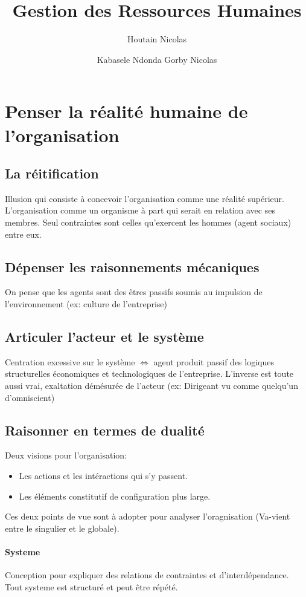 \documentclass[11pt]{article} %
\title{Gestion des Ressources Humaines}
\author{Houtain Nicolas \and Kabasele Ndonda Gorby Nicolas}
\begin{document}
\maketitle

\section{Penser la réalité humaine de l'organisation}
	\subsection{La réitification}
		Illusion qui consiste à concevoir l'organisation comme une réalité supérieur.
		L'organisation comme un organisme à part qui serait en relation avec ses membres.
		Seul contraintes sont celles qu'exercent les hommes (agent sociaux) entre eux.
	\subsection{Dépenser les raisonnements mécaniques}
		On pense que les agents sont des êtres passifs soumis au impulsion de l'environnement (ex: culture de
		l'entreprise)
	\subsection{Articuler l'acteur et le système}
		Centration excessive sur le système $\Leftrightarrow$ agent produit passif des logiques structurelles 
		économiques et technologiques de l'entreprise. L'inverse est toute aussi vrai, exaltation démésurée de 
		l'acteur (ex: Dirigeant vu comme quelqu'un d'omniscient)
	\subsection{Raisonner en termes de dualité}
		Deux visions pour l'organisation:
		\begin{itemize}
			\item Les actions et les intéractions qui s'y passent.
			\item Les éléments constitutif de configuration plus large.
		\end{itemize}
		Ces deux points de vue sont à adopter pour analyser l'oragnisation (Va-vient entre le singulier et le 		
		globale).
		\paragraph{Systeme} Conception pour expliquer des relations de contraintes et d'interdépendance. 
		Tout systeme est structuré et peut être répété.
\end{document}
